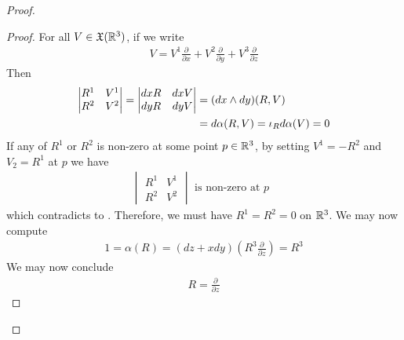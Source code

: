 \documentclass{report}
\begin{document}
\begin{proof}
\begin{proof}
For all $V \in \mathfrak{X}(\mathbb{R}^3)$, if we write 
\begin{align*}
V=V^1 \frac{\partial }{\partial x}+ V^2 \frac{\partial }{\partial y}+ V^3 \frac{\partial }{\partial z}
\end{align*}
Then 
\begin{align}
\label{sg}
\begin{vmatrix} 
  R^1 & V^1 \\
  R^2 & V^2
\end{vmatrix}=\begin{vmatrix} 
  dx R & dx V\\
  dy R & dy V
\end{vmatrix}&= (dx \wedge  dy)(R,V) \\
&=d\alpha (R,V)=\iota_R d\alpha (V)  =0 \notag 
\end{align}
If any of $R^1$ or $R^2$ is non-zero at some point $p \in\mathbb{R}^3$, by setting $V^1=-R^2$ and $V_2=R^1$ at  $p$ we have   
\begin{align*}
\begin{vmatrix} 
  R^1 & V^1 \\
  R^2 & V^2 
\end{vmatrix}\text{ is non-zero at $p$ }
\end{align*}
which contradicts to . Therefore, we must have $R^1=R^2=0$ on  $\mathbb{R}^3$. We may now compute 
 \begin{align*}
1=\alpha (R)= (dz+xdy) (R^3 \frac{\partial }{\partial z})= R^3
\end{align*}
We may now conclude 
\begin{align*}
  R=  \frac{\partial }{\partial z}
\end{align*}


\end{proof}
\end{proof}
\end{document}
